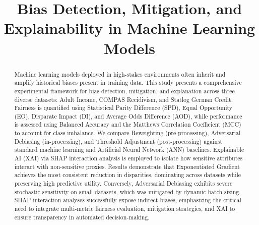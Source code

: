 \documentclass[conference]{IEEEtran}
\begin{document}
\title{Bias Detection, Mitigation, and Explainability in Machine Learning Models}

\author{
}

\maketitle

\begin{abstract}
Machine learning models deployed in high-stakes environments often inherit and amplify historical biases present in training data. This study presents a comprehensive experimental framework for bias detection, mitigation, and explanation across three diverse datasets: Adult Income, COMPAS Recidivism, and Statlog German Credit. Fairness is quantified using Statistical Parity Difference (SPD), Equal Opportunity (EO), Disparate Impact (DI), and Average Odds Difference (AOD), while performance is assessed using Balanced Accuracy and the Matthews Correlation Coefficient (MCC) to account for class imbalance. We compare Reweighting (pre-processing), Adversarial Debiasing (in-processing), and Threshold Adjustment (post-processing) against standard machine learning and Artificial Neural Network (ANN) baselines. Explainable AI (XAI) via SHAP interaction analysis is employed to isolate how sensitive attributes interact with non-sensitive proxies. Results demonstrate that Exponentiated Gradient achieves the most consistent reduction in disparities, dominating across datasets while preserving high predictive utility. Conversely, Adversarial Debiasing exhibits severe stochastic sensitivity on small datasets, which was mitigated by dynamic batch sizing. SHAP interaction analyses successfully expose indirect biases, emphasizing the critical need to integrate multi-metric fairness evaluation, mitigation strategies, and XAI to ensure transparency in automated decision-making.
\end{abstract}
\end{document}
